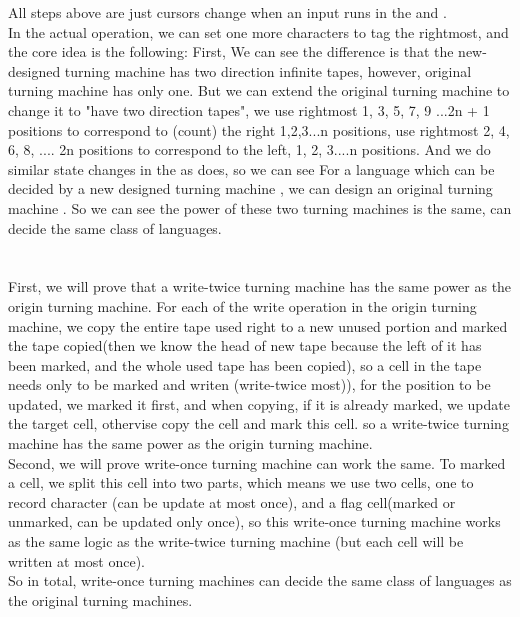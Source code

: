 \documentclass[11pt]{article}
\begin{document}
\begin{enumerate}[a)]
    All steps above are just cursors change when an input runs in the \mf{} and \ms{}. \\
    In the actual operation, we can set one more characters to tag the rightmost, and the core idea is the following:
    First, We can see the difference is that the new-designed turning machine has two direction infinite tapes, however, original turning machine has only one.
    But we can extend the original turning machine to change it to "have two direction tapes", we use rightmost 1, 3, 5, 7, 9 ...2n + 1 positions to correspond to
    (count) the right 1,2,3...n positions, use rightmost 2, 4, 6, 8, .... 2n positions to correspond to the left, 1, 2, 3....n positions. And we do similar state changes
    in the \ms{} as \mf{} does, so we can see For a language which can be decided by a new designed turning machine \mf{}, we can design an original turning machine \ms{}.
    So we can see the power of these two turning machines is the same, can decide the same class of languages.
\end{enumerate}
\part{}
First, we will prove that a write-twice turning machine has the same power as the origin turning machine. For each of the write operation in the origin turning machine,
we copy the entire tape used right to a new unused portion and marked the tape copied(then we know the head of new tape because the left of it has been marked, and the whole used tape has been copied), so a cell in the tape needs only to be marked and writen (write-twice most)), for the position to be updated, we marked it first, and when copying, if it is already marked, we update the target cell, othervise copy the cell and mark this cell.
so a write-twice turning machine has the same power as the origin turning machine. \\
Second, we will prove write-once turning machine can work the same. To marked a cell, we split this cell into two parts, which means we use two cells, one to record character (can be update at most once), and a flag cell(marked or unmarked, can be updated only once), so this write-once turning machine works as the same logic as the write-twice turning machine (but each cell will be written at most once). \\
So in total, write-once turning machines can decide the same class of languages as the original turning machines.
\end{document}
